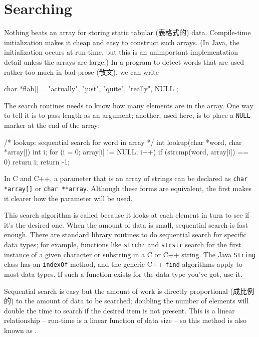 \section{Searching}
\label{sec:searching}

Nothing beats an array for storing static tabular (表格式的) data.
Compile-time initialization makes it cheap and easy to construct such
arrays. (In Java, the initialization occurs at run-time, but this is an
unimportant implementation detail unless the arrays are large.) In a
program to detect words that are used rather too much in bad prose (散文),
we can write
\begin{wellcode}
    char *flab[] = {
        "actually",
        "just",
        "quite",
        "really",
        NULL
    };
\end{wellcode}
The search routines needs to know how many elements are in the array. One
way to tell it is to pass length as an argument; another, used here, is to
place a \verb'NULL' marker at the end of the array:
\begin{wellcode}
    /* lookup: sequential search for word in array */
    int lookup(char *word, char *array[])
    {
        int i;
        for (i = 0; array[i] != NULL; i++)
           if (strcmp(word, array[i]) == 0)
                return i;
        return -1;
    }
\end{wellcode}
In C and C++, a parameter that is an array of strings can be declared as
\verb"char *array[]" or \verb"char **array". Although these forms are
equivalent, the first makes it clearer how the parameter will be used.

This search algorithm is called  because
it looks at each element in turn to see if it's the desired one. When the
amount of data is small, sequential search is fast enough. There are
standard library routines to do sequential search for specific data types;
for example, functions like \texttt{strchr} and \texttt{strstr} search for
the first instance of a given character or substring in a C or C++ string.
The Java \verb'String' class has an \verb'indexOf' method, and the generic
C++ \verb'find' algorithms apply to most data types. If such a function
exists for the data type you've got, use it.

Sequential search is easy but the amount of work is directly proportional
(成比例的) to the amount of data to be searched; doubling the number of
elements will double the time to search if the desired item is not present.
This is a linear relationship -- run-time is a linear function of data size
-- so this method is also known as .

